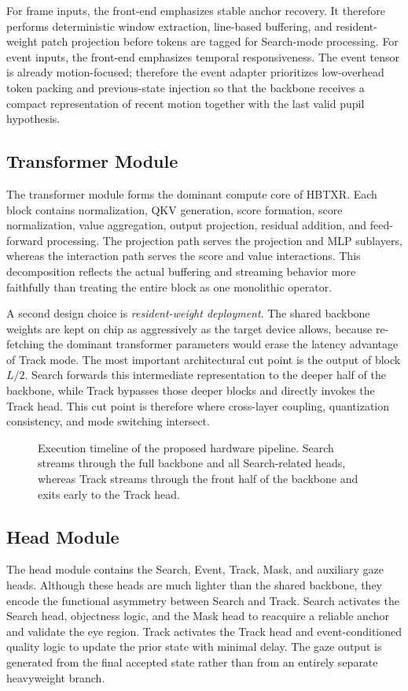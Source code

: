 \documentclass[journal]{IEEEtran}
\newcommand{\placeholderfigure}[2]{%
  \fbox{\parbox[c][#2][c]{#1}{\centering\vspace{2mm}\textbf{Figure placeholder}\\Final artwork pending\vspace{2mm}}}}
\begin{document}
For frame inputs, the front-end emphasizes stable anchor recovery. It therefore performs deterministic window extraction, line-based buffering, and resident-weight patch projection before tokens are tagged for Search-mode processing. For event inputs, the front-end emphasizes temporal responsiveness. The event tensor is already motion-focused; therefore the event adapter prioritizes low-overhead token packing and previous-state injection so that the backbone receives a compact representation of recent motion together with the last valid pupil hypothesis.

\subsection{Transformer Module}
The transformer module forms the dominant compute core of HBTXR. Each block contains normalization, QKV generation, score formation, score normalization, value aggregation, output projection, residual addition, and feed-forward processing. The projection path serves the projection and MLP sublayers, whereas the interaction path serves the score and value interactions. This decomposition reflects the actual buffering and streaming behavior more faithfully than treating the entire block as one monolithic operator.

A second design choice is \emph{resident-weight deployment}. The shared backbone weights are kept on chip as aggressively as the target device allows, because re-fetching the dominant transformer parameters would erase the latency advantage of Track mode. The most important architectural cut point is the output of block $L/2$. Search forwards this intermediate representation to the deeper half of the backbone, while Track bypasses those deeper blocks and directly invokes the Track head. This cut point is therefore where cross-layer coupling, quantization consistency, and mode switching intersect.

\begin{figure}[t]
\centering
\placeholderfigure{0.93\textwidth}{1.95in}
\caption{Execution timeline of the proposed hardware pipeline. Search streams through the full backbone and all Search-related heads, whereas Track streams through the front half of the backbone and exits early to the Track head.}
\label{fig:hw_timeline}
\end{figure}

\subsection{Head Module}
The head module contains the Search, Event, Track, Mask, and auxiliary gaze heads. Although these heads are much lighter than the shared backbone, they encode the functional asymmetry between Search and Track. Search activates the Search head, objectness logic, and the Mask head to reacquire a reliable anchor and validate the eye region. Track activates the Track head and event-conditioned quality logic to update the prior state with minimal delay. The gaze output is generated from the final accepted state rather than from an entirely separate heavyweight branch.
\end{document}
